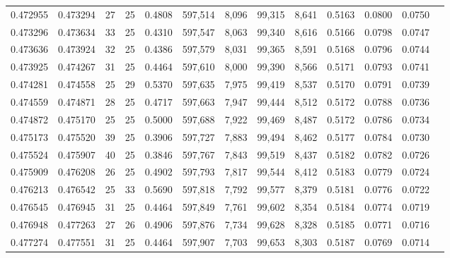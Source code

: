 \begin{tabular}{rrrrrrrrrrrrr}
0.472955 & 0.473294 &    27 &  25 &                                     0.4808 & 597,514 &   8,096 &  99,315 &   8,641 & 0.5163 & 0.0800 & 0.0750 \\
0.473296 & 0.473634 &    33 &  25 &                                     0.4310 & 597,547 &   8,063 &  99,340 &   8,616 & 0.5166 & 0.0798 & 0.0747 \\
0.473636 & 0.473924 &    32 &  25 &                                     0.4386 & 597,579 &   8,031 &  99,365 &   8,591 & 0.5168 & 0.0796 & 0.0744 \\
0.473925 & 0.474267 &    31 &  25 &                                     0.4464 & 597,610 &   8,000 &  99,390 &   8,566 & 0.5171 & 0.0793 & 0.0741 \\
0.474281 & 0.474558 &    25 &  29 &                                     0.5370 & 597,635 &   7,975 &  99,419 &   8,537 & 0.5170 & 0.0791 & 0.0739 \\
0.474559 & 0.474871 &    28 &  25 &                                     0.4717 & 597,663 &   7,947 &  99,444 &   8,512 & 0.5172 & 0.0788 & 0.0736 \\
0.474872 & 0.475170 &    25 &  25 &                                     0.5000 & 597,688 &   7,922 &  99,469 &   8,487 & 0.5172 & 0.0786 & 0.0734 \\
0.475173 & 0.475520 &    39 &  25 &                                     0.3906 & 597,727 &   7,883 &  99,494 &   8,462 & 0.5177 & 0.0784 & 0.0730 \\
0.475524 & 0.475907 &    40 &  25 &                                     0.3846 & 597,767 &   7,843 &  99,519 &   8,437 & 0.5182 & 0.0782 & 0.0726 \\
0.475909 & 0.476208 &    26 &  25 &                                     0.4902 & 597,793 &   7,817 &  99,544 &   8,412 & 0.5183 & 0.0779 & 0.0724 \\
0.476213 & 0.476542 &    25 &  33 &                                     0.5690 & 597,818 &   7,792 &  99,577 &   8,379 & 0.5181 & 0.0776 & 0.0722 \\
0.476545 & 0.476945 &    31 &  25 &                                     0.4464 & 597,849 &   7,761 &  99,602 &   8,354 & 0.5184 & 0.0774 & 0.0719 \\
0.476948 & 0.477263 &    27 &  26 &                                     0.4906 & 597,876 &   7,734 &  99,628 &   8,328 & 0.5185 & 0.0771 & 0.0716 \\
0.477274 & 0.477551 &    31 &  25 &                                     0.4464 & 597,907 &   7,703 &  99,653 &   8,303 & 0.5187 & 0.0769 & 0.0714 \\

\end{tabular}
